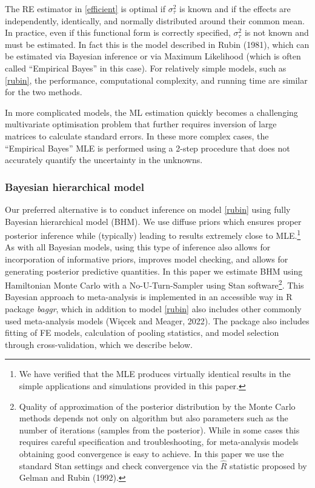 \documentclass[12pt]{article}
\begin{document}
The RE estimator in \eqref{efficient} is optimal if $\sigma^2_{\tau}$ is known and if the effects are independently, identically, and normally distributed around their common mean. 
In practice, even if this functional form is correctly specified, $\sigma^2_{\tau}$ is not known and must be estimated. In fact this is the model described in Rubin (1981), which can be estimated via Bayesian inference or via Maximum Likelihood (which is often called ``Empirical Bayes'' in this case). For relatively simple models, such as \eqref{rubin}, the performance, computational complexity, and running time are similar for the two methods. 

In more complicated models, the ML estimation quickly becomes a challenging multivariate optimisation problem that further requires inversion of large matrices to calculate standard errors. In these more complex cases, the ``Empirical Bayes'' MLE is performed using a 2-step procedure that does not accurately quantify the uncertainty in the unknowns. 

\subsubsection*{Bayesian hierarchical model}

Our preferred alternative is to conduct inference on model \eqref{rubin} using fully Bayesian hierarchical model (BHM). We use diffuse priors which ensures proper posterior inference while (typically) leading to results extremely close to MLE.\footnote{We have verified that the MLE produces virtually identical results in the simple applications and simulations provided in this paper.} As with all Bayesian models, using this type of inference also allows for incorporation of informative priors, improves model checking, and allows for generating posterior predictive quantities. In this paper we estimate BHM using Hamiltonian Monte Carlo with a No-U-Turn-Sampler using Stan software\footnote{Quality of approximation of the posterior distribution by the Monte Carlo methods depends not only on algorithm but also parameters such as the number of iterations (samples from the posterior). While in some cases this requires careful specification and troubleshooting, for meta-analysis models obtaining good convergence is easy to achieve. In this paper we use the standard Stan settings and check convergence via the $\hat{R}$ statistic proposed by Gelman and Rubin (1992).}. This Bayesian approach to meta-analysis is implemented in an accessible way in R package \textit{baggr}, which in addition to model \eqref{rubin} also includes other commonly used meta-analysis models (Więcek and Meager, 2022). The package also includes fitting of FE models, calculation of pooling statistics, and model selection through cross-validation, which we describe below.
\end{document}
